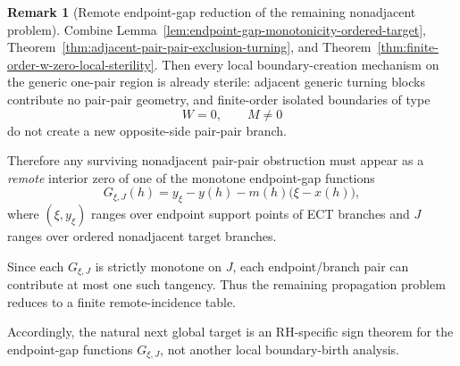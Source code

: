 \documentclass[11pt,a4paper]{amsart}
\theoremstyle{plain}
\theoremstyle{definition}
\newtheorem{remark}[theorem]{Remark}
\begin{document}
\begin{remark}[Remote endpoint-gap reduction of the remaining nonadjacent problem]
\label{rem:remote-endpoint-gap-reduction}
Combine Lemma~\ref{lem:endpoint-gap-monotonicity-ordered-target},
Theorem~\ref{thm:adjacent-pair-pair-exclusion-turning}, and
Theorem~\ref{thm:finite-order-w-zero-local-sterility}. Then every local
boundary-creation mechanism on the generic one-pair region is already sterile:
adjacent generic turning blocks contribute no pair-pair geometry, and
finite-order isolated boundaries of type
\[
W=0,
\qquad
M\neq 0
\]
do not create a new opposite-side pair-pair branch.

Therefore any surviving nonadjacent pair-pair obstruction must appear as a
\emph{remote} interior zero of one of the monotone endpoint-gap functions
\[
G_{\xi,J}(h)=y_\xi-y(h)-m(h)\bigl(\xi-x(h)\bigr),
\]
where $(\xi,y_\xi)$ ranges over endpoint support points of ECT branches and
$J$ ranges over ordered nonadjacent target branches.

Since each $G_{\xi,J}$ is strictly monotone on $J$, each endpoint/branch pair
can contribute at most one such tangency. Thus the remaining propagation
problem reduces to a finite remote-incidence table.

Accordingly, the natural next global target is an RH-specific sign theorem for
the endpoint-gap functions $G_{\xi,J}$, not another local boundary-birth
analysis.
\end{remark}
\end{document}
